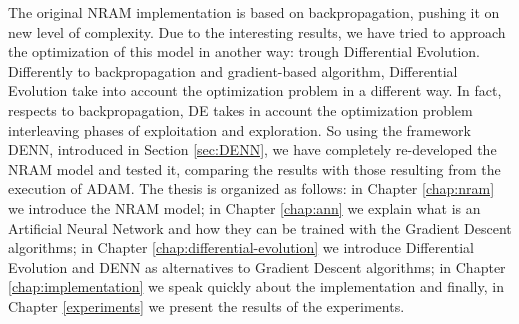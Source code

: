 The original NRAM implementation is based on backpropagation, pushing it on new level of complexity. Due to the interesting results, we have tried to approach the optimization of this model in another way: trough Differential Evolution. Differently to backpropagation and gradient-based algorithm, Differential Evolution take into account the optimization problem in a different way. In fact, respects to backpropagation, DE takes in account the optimization problem interleaving phases of exploitation and exploration. So using the framework DENN, introduced in Section \ref{sec:DENN}, we have completely re-developed the NRAM model and tested it, comparing the results with those resulting from the execution of ADAM.\newline\newline
The thesis is organized as follows: in Chapter \ref{chap:nram} we introduce the NRAM model; in Chapter \ref{chap:ann} we explain what is an Artificial Neural Network and how they can be trained with the Gradient Descent algorithms; in Chapter \ref{chap:differential-evolution} we introduce Differential Evolution and DENN as alternatives to Gradient Descent algorithms; in Chapter \ref{chap:implementation} we speak quickly about the implementation and finally, in Chapter \ref{experiments} we present the results of the experiments.
